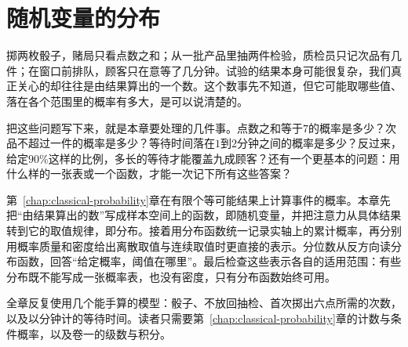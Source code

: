 \chapter{随机变量的分布}
\label{chap:random-variables}

掷两枚骰子，赌局只看点数之和；从一批产品里抽两件检验，质检员只记次品有几件；在窗口前排队，顾客只在意等了几分钟。试验的结果本身可能很复杂，我们真正关心的却往往是由结果算出的一个数。这个数事先不知道，但它可能取哪些值、落在各个范围里的概率有多大，是可以说清楚的。

把这些问题写下来，就是本章要处理的几件事。点数之和等于$7$的概率是多少？次品不超过一件的概率是多少？等待时间落在$1$到$2$分钟之间的概率是多少？反过来，给定$90\%$这样的比例，多长的等待才能覆盖九成顾客？还有一个更基本的问题：用什么样的一张表或一个函数，才能一次记下所有这些答案？

第~\ref{chap:classical-probability}章在有限个等可能结果上计算事件的概率。本章先把“由结果算出的数”写成样本空间上的函数，即随机变量，并把注意力从具体结果转到它的取值规律，即分布。接着用分布函数统一记录实轴上的累计概率，再分别用概率质量和密度给出离散取值与连续取值时更直接的表示。分位数从反方向读分布函数，回答“给定概率，阈值在哪里”。最后检查这些表示各自的适用范围：有些分布既不能写成一张概率表，也没有密度，只有分布函数始终可用。

全章反复使用几个能手算的模型：骰子、不放回抽检、首次掷出六点所需的次数，以及以分钟计的等待时间。读者只需要第~\ref{chap:classical-probability}章的计数与条件概率，以及卷一的级数与积分。












